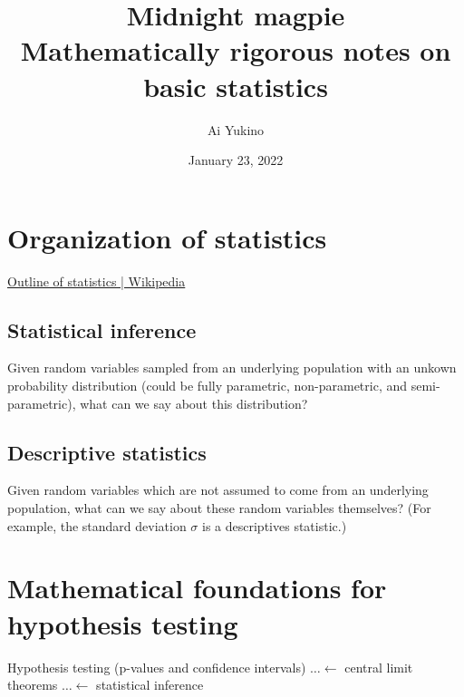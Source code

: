 \documentclass{article}
\begin{document}
\title{Midnight magpie \\
	\large Mathematically rigorous notes on basic statistics}
\author{Ai Yukino}
\date{January 23, 2022}
\maketitle
\hypersetup{linkcolor = internallinkcolor}
\tableofcontents
\hypersetup{linkcolor= .}

\section{Organization of statistics}

\href{https://en.wikipedia.org/wiki/Outline_of_statistics}{Outline of statistics | Wikipedia}

\subsection{Statistical inference}

Given random variables sampled from an underlying population with an unkown probability distribution (could be fully parametric, non-parametric, and semi-parametric), what can we say about this distribution?

\subsection{Descriptive statistics}

Given random variables which are not assumed to come from an underlying population, what can we say about these random variables themselves?
(For example, the standard deviation $\sigma$ is a descriptives statistic.)
\section{Mathematical foundations for hypothesis testing}

Hypothesis testing (p-values and confidence intervals) $\dots \leftarrow$ central limit theorems $\dots \leftarrow$ statistical inference

\end{document}
